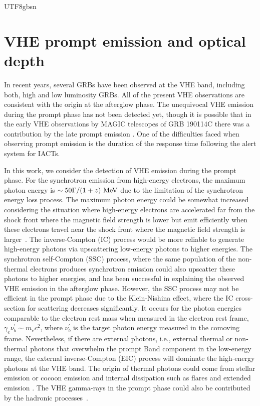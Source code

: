 \documentclass[fleqn,usenatbib]{mnras}
\begin{document}
\begin{CJK*}{UTF8}{gbsn}
\section{VHE prompt emission and optical depth}\label{sec:vhe}
In recent years, several GRBs have been observed at the VHE band, including both, high and low luminosity GRBs. All of the present VHE observations are consistent with the origin at the afterglow phase.
The unequivocal VHE emission during the prompt phase has not been detected yet, though it is possible that in the early VHE observations by MAGIC telescopes of GRB 190114C there was a contribution by the late prompt emission  \citep{nature1}. 
One of the difficulties faced when observing prompt emission is the duration of the response time following the alert system for IACTs.

In this work, we consider the detection of VHE emission during the prompt phase.
For the synchrotron emission from high-energy electrons, the maximum photon energy is $\sim 50\Gamma / (1 + z)\rm~MeV$ due to the limitation of the synchrotron energy loss process. 
The maximum photon energy could be somewhat increased considering the situation where high-energy electrons are accelerated far from the shock front where the magnetic field strength is lower but emit efficiently when these electrons travel near the shock front where the magnetic field strength is larger~\citep{Kumar:2012xm}. The inverse-Compton (IC) process would be more reliable to generate high-energy photons via upscattering low-energy photons to higher energies. The synchrotron self-Compton (SSC) process, where the same population of the non-thermal electrons produces synchrotron emission could also upscatter these photons to higher energies, and has been successful in explaining the observed VHE emission in the afterglow phase. 
However, the SSC process may not be efficient in the prompt phase due to the Klein-Nishina effect, where the IC cross-section for scattering decreases significantly. It occurs for the photon energies comparable to the electron rest mass when measured in the electron rest frame, $\gamma_e \nu_b^\prime \sim m_e c^2$, where $\nu_b^\prime$ is the target photon energy measured in the comoving frame. 
Nevertheless, if there are external photons, i.e., external thermal or non-thermal photons that overwhelm the prompt Band component in the low-energy range, the external inverse-Compton (EIC) process will dominate the high-energy photons at the VHE band. The origin of thermal photons could come from stellar emission or cocoon emission \citep[e.g.,][]{Toma09,decolle2018,Kimura19} and internal dissipation such as flares and extended emission \citep[e.g.,][]{murase+2018}.
The VHE gamma-rays in the prompt phase could also be contributed by the hadronic processes~\citep{Asano:2007my, Gupta:2007yb, razzaque2009, murase+2012, rudolph23}.


\end{CJK*}
\end{document}
